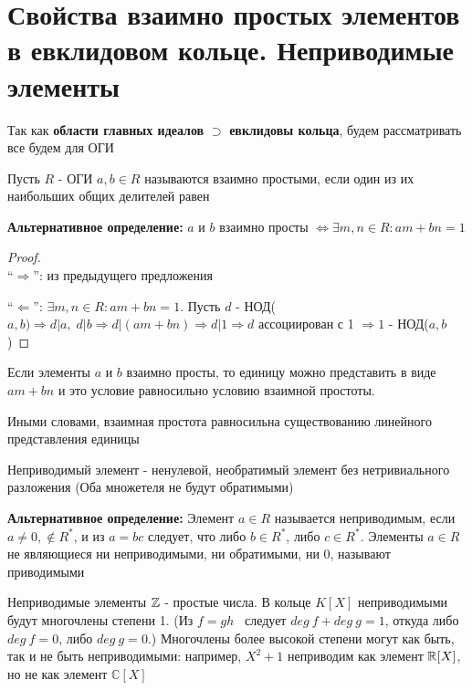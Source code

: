 \section{Свойства взаимно простых элементов в евклидовом кольце. Неприводимые элементы}
\begin{normalsize}
    Так как \textbf{области главных идеалов} $\supset$ \textbf{евклидовы кольца}, будем рассматривать все будем для ОГИ \\
    \begin{conj}
        Пусть $R$ - ОГИ 
        $a, b \in R$ называются взаимно простыми, если один из их наибольших общих делителей равен
    \end{conj}
    \textbf{Альтернативное определение:} $a$ и $b$ взаимно просты $\Longleftrightarrow \exists m,n \in R: am + bn = 1$ 
    \begin{proof} \quad \\
        ``$\Longrightarrow$'': из предыдущего предложения

        ``$\Longleftarrow$'': $\exists m,n \in R: am + bn = 1$. Пусть $d$ - НОД($a, b) \Longrightarrow d|a, \; d|b \Longrightarrow d|(am + bn) 
        \Longrightarrow d|1 \Longrightarrow d$ ассоциирован с 1 $\Longrightarrow 1$ - НОД($a, b$) 
    \end{proof}
    Если элементы $a$ и $b$ взаимно просты, то единицу можно представить в виде $am + bn$ и это условие равносильно условию взаимной простоты.

    Иными словами, взаимная простота равносильна существованию линейного представления единицы
    \begin{conj}
        Неприводимый элемент - ненулевой, необратимый элемент без нетривиального разложения (Оба множетеля не будут обратимыми)
    \end{conj}
    \textbf{Альтернативное определение:} Элемент $a \in R$ называется неприводимым, если $a \neq 0, \notin R^*$, и из 
    $a = bc$ следует, что либо $b \in R^*$, либо $c \in R^*$. Элементы $a \in R$ не являющиеся ни неприводимыми, ни обратимыми, ни 0, называют приводимыми
    
    \qquad Неприводимые элементы $\mathbb{Z}$ - простые числа. В кольце $K[X]$ неприводимыми будут многочлены степени 1. (Из $f = gh$  следует $deg \ f + deg \ g = 1$, откуда либо
    $deg \ f = 0$, либо $deg \ g = 0$.) Многочлены более высокой степени могут как быть, так и не быть неприводимыми: например, $X^2 + 1$ 
    неприводим как элемент $\mathbb{R}[X]$, но не как элемент $\mathbb{C}[X]$


\end{normalsize}
